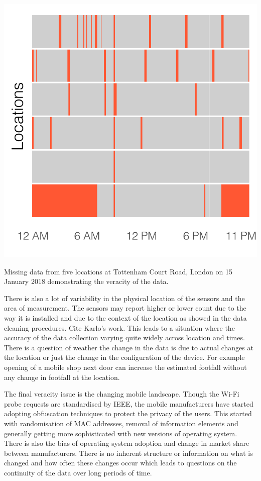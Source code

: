 \begin{marginfigure}
  \includegraphics{images/data-veracity-gaps.png}
  \caption{Missing data from five locations at Tottenham Court Road, London on 15 January 2018 demonstrating the veracity of the data.}
  \label{figure:toolkit:veracity:gaps}
\end{marginfigure}


There is also a lot of variability in the physical location of the sensors and the area of measurement.
The sensors may report higher or lower count due to the way it is installed and due to the context of the location as showed in the data cleaning procedures.
Cite Karlo's work.
This leads to a situation where the accuracy of the data collection varying quite widely across location and times.
There is a question of weather the change in the data is due to actual changes at the location or just the change in the configuration of the device.
For example opening of a mobile shop next door can increase the estimated footfall without any change in footfall at the location.

The final veracity issue is the changing mobile landscape.
Though the Wi-Fi probe requests are standardised by IEEE, the mobile manufacturers have started adopting obfuscation techniques to protect the privacy of the users.
This started with randomisation of MAC addresses, removal of information elements and generally getting more sophisticated with new versions of operating system.
There is also the bias of operating system adoption and change in market share between manufacturers.
There is no inherent structure or information on what is changed and how often these changes occur which leads to questions on the continuity of the data over long periods of time.

